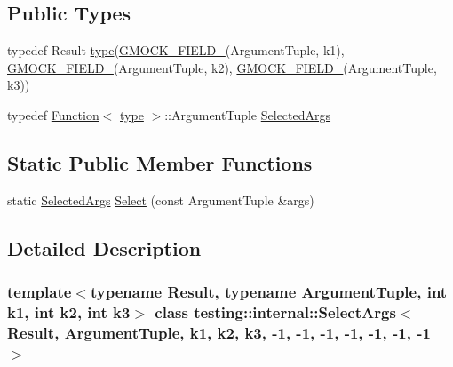 \subsection*{Public Types}
\begin{DoxyCompactItemize}
\item 
typedef Result \hyperlink{classtesting_1_1internal_1_1SelectArgs_3_01Result_00_01ArgumentTuple_00_01k1_00_01k2_00_01k3_00_4b8877f94cb457a4d2bd6b2630090309_ad8ecea11407ad5d56b86e33af853f265}{type}(\hyperlink{gmock-generated-actions_8h_a6eb3ce92b0613603057a20ec9e593317}{G\+M\+O\+C\+K\+\_\+\+F\+I\+E\+L\+D\+\_\+}(Argument\+Tuple, k1), \hyperlink{gmock-generated-actions_8h_a6eb3ce92b0613603057a20ec9e593317}{G\+M\+O\+C\+K\+\_\+\+F\+I\+E\+L\+D\+\_\+}(Argument\+Tuple, k2), \hyperlink{gmock-generated-actions_8h_a6eb3ce92b0613603057a20ec9e593317}{G\+M\+O\+C\+K\+\_\+\+F\+I\+E\+L\+D\+\_\+}(Argument\+Tuple, k3))
\item 
typedef \hyperlink{structtesting_1_1internal_1_1Function}{Function}$<$ \hyperlink{classtesting_1_1internal_1_1SelectArgs_3_01Result_00_01ArgumentTuple_00_01k1_00_01k2_00_01k3_00_4b8877f94cb457a4d2bd6b2630090309_ad8ecea11407ad5d56b86e33af853f265}{type} $>$\+::Argument\+Tuple \hyperlink{classtesting_1_1internal_1_1SelectArgs_3_01Result_00_01ArgumentTuple_00_01k1_00_01k2_00_01k3_00_4b8877f94cb457a4d2bd6b2630090309_a6780fe203ee6f054ad07b84d9ec68dfd}{Selected\+Args}
\end{DoxyCompactItemize}
\subsection*{Static Public Member Functions}
\begin{DoxyCompactItemize}
\item 
static \hyperlink{classtesting_1_1internal_1_1SelectArgs_3_01Result_00_01ArgumentTuple_00_01k1_00_01k2_00_01k3_00_4b8877f94cb457a4d2bd6b2630090309_a6780fe203ee6f054ad07b84d9ec68dfd}{Selected\+Args} \hyperlink{classtesting_1_1internal_1_1SelectArgs_3_01Result_00_01ArgumentTuple_00_01k1_00_01k2_00_01k3_00_4b8877f94cb457a4d2bd6b2630090309_a9f107cf68229d35e8ad5c1aa2091bde3}{Select} (const Argument\+Tuple \&args)
\end{DoxyCompactItemize}


\subsection{Detailed Description}
\subsubsection*{template$<$typename Result, typename Argument\+Tuple, int k1, int k2, int k3$>$\newline
class testing\+::internal\+::\+Select\+Args$<$ Result, Argument\+Tuple, k1, k2, k3, -\/1, -\/1, -\/1, -\/1, -\/1, -\/1, -\/1 $>$}



